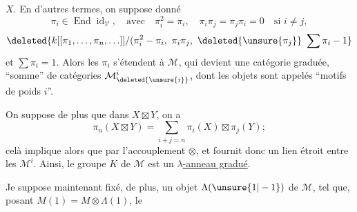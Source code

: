 $X$. En d'autres termes, on suppose donné 
\[
\pi_i\in\operatorname{End}\operatorname{id}_{\mathcal V},\quad\text{avec}\quad
\pi_i^2=\pi_i,\quad\pi_i\pi_j=\pi_j\pi_i=0\quad\text{si }i\ne j,
\]
\[
\deleted{k[[\pi_1,\ldots,\pi_n,\ldots]]/(\pi_i^2-\pi_i,\ \pi_i\pi_j,\ \deleted{\unsure{\pi_j}}\ \sum\pi_i-1}
\]
et $\sum\pi_i=1$. 
Alors les $\pi_i$ s'étendent à $\mathcal M$, qui devient une catégorie graduée,  ``somme'' de catégories $\mathcal M^{i}_{\deleted{\unsure{i}}}$, dont les objets sont appelés ``motifs de poids $i$''.

On suppose de plus que dans $X\boxtimes Y$, on a
\[
\pi_n(X\boxtimes Y)=\sum_{i+j=n}\pi_i(X)\boxtimes\pi_j(Y);
\]
celà implique alors que
par l'accouplement $\otimes$, et fournit donc un lien étroit entre les $\mathcal M^i$. Ainsi, le groupe $K$ de $\mathcal M$ est un \uline{$\lambda$-anneau gradué}.

 Je suppose maintenant fixé, de plus, un objet  $\Lambda(\unsure{1|-1})$ de $\mathcal M$, tel que, posant \deleted{\unsure{\Lambda}} $M(1)=M\otimes\Lambda(1)$,  le
